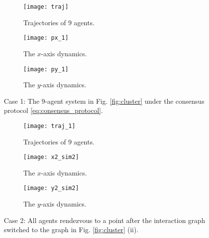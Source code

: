 \documentclass[draftclsnofoot,11pt,onecolumn]{IEEEtran}
\begin{document}
\begin{figure*}[t!]
    \begin{subfigure}[b]{0.33\textwidth}
    \centering
    \texttt{[image: traj]}
    \caption{Trajectories of 9 agents.}
    \label{fig:sim1a}
    \end{subfigure}
    \begin{subfigure}[b]{0.33\textwidth}
    \centering
    \texttt{[image: px\_1]}
    \caption{The $x$-axis dynamics.}
    \label{fig:sim1c}
    \end{subfigure}    
    \begin{subfigure}[b]{0.33\textwidth}
    \centering
    \texttt{[image: py\_1]}
    \caption{The $y$-axis dynamics.}
    \label{fig:sim1d}
    \end{subfigure}
    \caption{Case 1: The 9-agent system in Fig. \ref{fig:cluster} under the consensus protocol \eqref{eq:consensus_protocol}.}
    \label{fig:simulation}
\end{figure*}
\begin{figure*}[t]
    \begin{subfigure}[b]{0.33\textwidth}
    \centering
    \texttt{[image: traj\_1]}
    \caption{Trajectories of 9 agents.}
    \label{fig:sim1a1}
    \end{subfigure}
    \begin{subfigure}[b]{0.33\textwidth}
    \centering
    \texttt{[image: x2\_sim2]}
    \caption{The $x$-axis dynamics.}
    \label{fig:sim1c1}
    \end{subfigure}    
    \begin{subfigure}[b]{0.33\textwidth}
    \centering
    \texttt{[image: y2\_sim2]}
    \caption{The $y$-axis dynamics.}
    \label{fig:sim1d1}
    \end{subfigure}
    \caption{Case 2: All agents rendezvous to a point after the interaction graph switched to the graph in Fig. \ref{fig:cluster} (ii).}
    \label{fig:simulation1}
\end{figure*}
\end{document}
